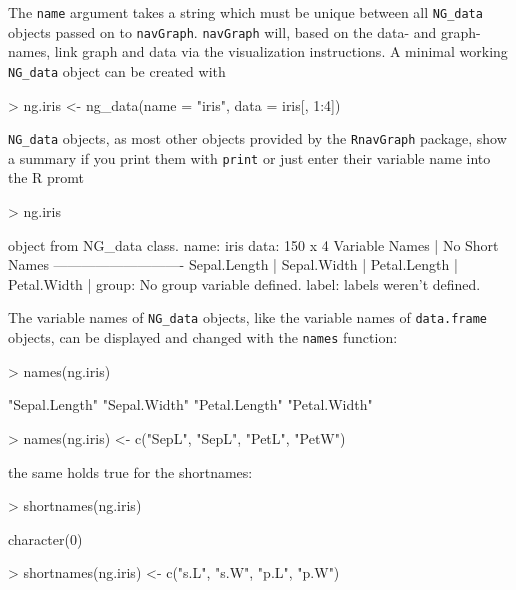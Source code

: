 \documentclass[12pt,oneside,titlepage,letter]{article}
\begin{document}
The \texttt{name} argument takes a string which must be unique between all \texttt{NG\_data} objects passed on to \texttt{navGraph}. \texttt{navGraph} will, based on the data- and graph- names, link graph and data via the visualization instructions. A minimal working \texttt{NG\_data} object can be created with
\begin{Schunk}
\begin{Sinput}
> ng.iris <- ng_data(name = "iris", data = iris[, 1:4])
\end{Sinput}
\end{Schunk}
\texttt{NG\_data} objects, as most other objects provided by the \texttt{RnavGraph} package, show a summary if you print them with \texttt{print} or just enter their variable name into the R promt
\begin{Schunk}
\begin{Sinput}
> ng.iris
\end{Sinput}
\begin{Soutput}
object from NG_data class.
  name: iris 
  data: 150 x 4 
    Variable Names | No Short Names
    ----------------------------
    Sepal.Length   | 
    Sepal.Width    | 
    Petal.Length   | 
    Petal.Width    | 
  group:  No group variable defined.
  label: labels weren't defined.
\end{Soutput}
\end{Schunk}

The variable names of \texttt{NG\_data} objects, like the variable names of \texttt{data.frame} objects, can be displayed and changed with the \texttt{names} function:

\begin{Schunk}
\begin{Sinput}
> names(ng.iris)
\end{Sinput}
\begin{Soutput}
[1] "Sepal.Length" "Sepal.Width"  "Petal.Length" "Petal.Width" 
\end{Soutput}
\begin{Sinput}
> names(ng.iris) <- c("SepL", "SepL", "PetL", "PetW")
\end{Sinput}
\end{Schunk}

the same holds true for the shortnames:

\begin{Schunk}
\begin{Sinput}
> shortnames(ng.iris)
\end{Sinput}
\begin{Soutput}
character(0)
\end{Soutput}
\begin{Sinput}
> shortnames(ng.iris) <- c("s.L", "s.W", "p.L", "p.W")
\end{Sinput}
\end{Schunk}
\end{document}
